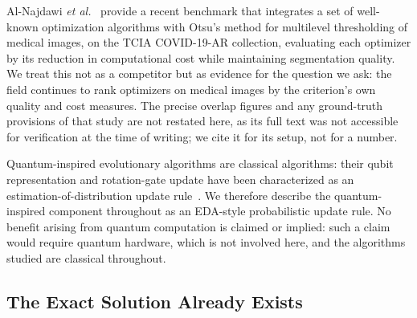 Al-Najdawi \emph{et al.}~\cite{alnajdawi_scirep} provide a recent benchmark that
integrates a set of well-known optimization algorithms with Otsu's method for
multilevel thresholding of medical images, on the TCIA COVID-19-AR collection,
evaluating each optimizer by its reduction in computational cost while
maintaining segmentation quality. We treat this not as a competitor but as
evidence for the question we ask: the field continues to rank optimizers on
medical images by the criterion's own quality and cost measures. The precise
overlap figures and any ground-truth provisions of that study are not restated
here, as its full text was not accessible for verification at the time of
writing; we cite it for its setup, not for a number.

Quantum-inspired evolutionary algorithms are classical algorithms: their qubit
representation and rotation-gate update have been characterized as an
estimation-of-distribution update rule~\cite{platel_tevc}. We therefore describe
the quantum-inspired component throughout as an EDA-style probabilistic update
rule. No benefit arising from quantum computation is claimed or implied: such a
claim would require quantum hardware, which is not involved here, and the
algorithms studied are classical throughout.

\subsection{The Exact Solution Already Exists}

